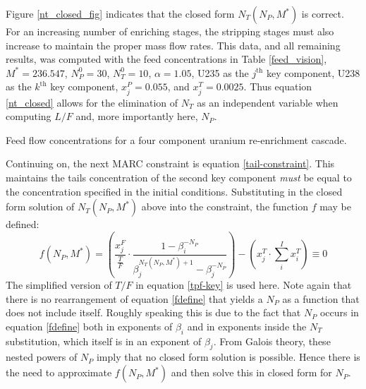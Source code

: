 \documentclass{ansconf}
\newcommand{\nuc}[2]{{#1}{#2}}
\newcommand{\jth}[0]{$j^{\mbox{th}}$ }
\newcommand{\kth}[0]{$k^{\mbox{th}}$ }
\begin{document}
Figure \ref{nt_closed_fig} indicates that the closed form $N_T(N_P, M^*)$ is correct.
For an increasing number of enriching stages, the stripping stages must also 
increase to maintain the proper mass flow rates.
This data, and all remaining results, was computed 
with the feed concentrations in Table \ref{feed_vision}, 
$M^*=236.547$, $N_P^0=30$, $N_T^0=10$, $\alpha=1.05$, 
\nuc{U}{235} as the \jth key component, \nuc{U}{238} as the \kth key component, 
$x_j^P=0.055$, and $x_j^T=0.0025$.
Thus equation \ref{nt_closed} allows for the elimination of $N_T$ as an 
independent variable when computing $L/F$ and, more importantly here, $N_P$.  

\begin{table}[htbp]
\begin{center}
\caption{Feed flow concentrations for a four component uranium re-enrichment cascade.}

\label{feed_vision}
\end{center}
\end{table}

Continuing on, the next MARC constraint is equation \ref{tail-constraint}.  
This maintains
the tails concentration of the second key component \emph{must} be equal to the 
concentration specified in the initial conditions.  
Substituting in the closed form solution of $N_T(N_P, M^*)$ above into the constraint, 
the function $f$ may be defined:
\begin{equation}
f(N_P,M^*) =
\left(\frac{x_j^F}{\frac{T}{F}} \cdot \frac{1 - \beta_i^{-N_P}}
                                           {\beta_j^{N_T(N_P,M^*)+1} - \beta_j^{-N_P}} \right)
- \left(x_j^T\cdot\sum_i^{I} x_i^T\right) \equiv 0
\label{fdefine}
\end{equation}
The simplified version of $T/F$ in equation \ref{tpf-key} is used here.  Note again
that there is no rearrangement of equation \ref{fdefine} that yields a $N_P$ as 
a function that does not include itself.  Roughly speaking this is due to the 
fact that $N_P$ occurs in equation \ref{fdefine} both in exponents of $\beta_i$ and
in exponents inside the $N_T$ substitution, which itself is in an exponent of 
$\beta_j$.  From Galois theory, these nested powers of $N_P$ imply that no closed form 
solution is possible.   Hence there is the need to approximate $f(N_P, M^*)$ and then
solve this in closed form for $N_P$.
\end{document}
